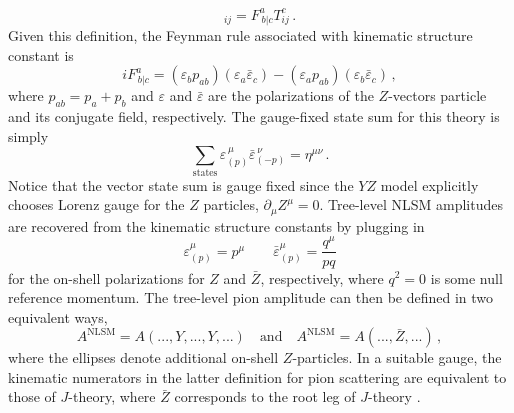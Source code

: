 \documentclass[11pt,letter]{article}
\def\be{\begin{equation}}
\begin{document}
\begin{equation}
[T^a,T^b]_{ij}= F^{a}_{\,b|c}T^c_{ij}\, .
\end{equation}
Given this definition, the Feynman rule associated with kinematic structure constant is
\be\label{eq:FeynmanRuleXZZ}
i F^{a}_{\,b|c} = (\varepsilon_b p_{ab})(\varepsilon_a\bar{\varepsilon}_c) - (\varepsilon_a p_{ab})(\varepsilon_b\bar{\varepsilon}_c)\, ,
\end{equation}
where $p_{ab}=p_a+p_b$ and $\varepsilon$ and $\bar{\varepsilon}$ are the polarizations of the $Z$-vectors particle and its conjugate field, respectively. The gauge-fixed state sum for this theory is simply
\begin{equation}
\sum_{\text{states}} \varepsilon^{\,\mu}_{(p)}\bar{\varepsilon}^{\,\nu}_{(-p)} = \eta^{\mu\nu}\, .
\end{equation}
Notice that the vector state sum is gauge fixed since the $YZ$ model explicitly chooses Lorenz gauge for the $Z$ particles, $\partial_\mu Z^\mu=0$.
Tree-level NLSM amplitudes are recovered from the kinematic structure constants by plugging in
\be\label{eq:onShellZStates}
\varepsilon^\mu_{(p)} = p^\mu \qquad \bar{\varepsilon}^\mu_{(p)} = \frac{q^\mu}{pq}
\end{equation}
 for the on-shell polarizations for $Z$ and $\bar{Z}$, respectively, where $q^2=0$ is some null reference momentum.
 The tree-level pion amplitude can then be defined in two equivalent ways,
\begin{equation}
\label{eq:TwoNLSMMethods}
A^{\text{NLSM}} = A(...,Y,...,Y,...) ~~~ \text{ and } ~~~ A^{\text{NLSM}}= A(...,\bar{Z},...) \, ,
\end{equation}
where the ellipses denote additional on-shell $Z$-particles. In a suitable gauge, the kinematic numerators in the latter definition for pion scattering are equivalent to those of $J$-theory, where $\bar{Z}$ corresponds to the root leg of $J$-theory \cite{Cheung:2021zvb}.
\end{document}
